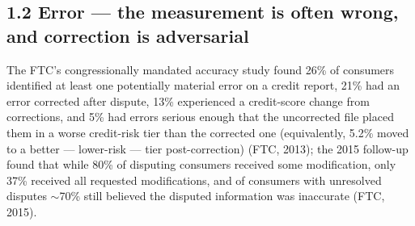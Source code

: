 \documentclass[
]{article}
\begin{document}
\subsection{1.2 Error --- the measurement is often wrong, and correction
is
adversarial}\label{error-the-measurement-is-often-wrong-and-correction-is-adversarial}

The FTC's congressionally mandated accuracy study found 26\% of
consumers identified at least one potentially material error on a credit
report, 21\% had an error corrected after dispute, 13\% experienced a
credit-score change from corrections, and 5\% had errors serious enough
that the uncorrected file placed them in a worse credit-risk tier than
the corrected one (equivalently, 5.2\% moved to a better --- lower-risk
--- tier post-correction) (FTC, 2013); the 2015 follow-up found that
while 80\% of disputing consumers received some modification, only 37\%
received all requested modifications, and of consumers with unresolved
disputes \(\sim\)70\% still believed the disputed information was
inaccurate (FTC, 2015).
\end{document}
